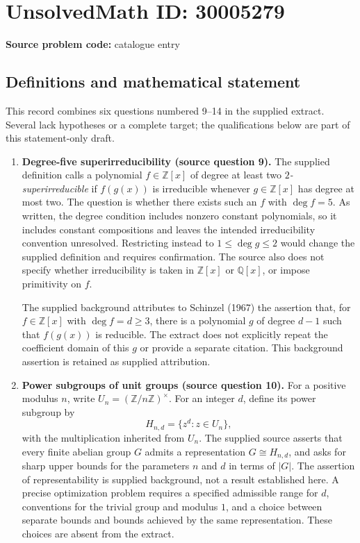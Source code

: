 \documentclass[11pt]{article}
\newcommand{\Z}{\mathbb{Z}}
\newcommand{\Q}{\mathbb{Q}}
\begin{document}
\section*{UnsolvedMath ID: 30005279}
\textbf{Source problem code:} catalogue entry
\subsection{Definitions and mathematical statement}
This record combines six questions numbered 9--14 in the supplied extract. Several lack hypotheses or a complete target; the qualifications below are part of this statement-only draft.

\begin{enumerate}
\item \textbf{Degree-five superirreducibility (source question 9).} The supplied definition calls a polynomial \(f\in\Z[x]\) of degree at least two \emph{\(2\)-superirreducible} if \(f(g(x))\) is irreducible whenever \(g\in\Z[x]\) has degree at most two. The question is whether there exists such an \(f\) with \(\deg f=5\). As written, the degree condition includes nonzero constant polynomials, so it includes constant compositions and leaves the intended irreducibility convention unresolved. Restricting instead to \(1\leq\deg g\leq2\) would change the supplied definition and requires confirmation. The source also does not specify whether irreducibility is taken in \(\Z[x]\) or \(\Q[x]\), or impose primitivity on \(f\).

The supplied background attributes to Schinzel (1967) the assertion that, for \(f\in\Z[x]\) with \(\deg f=d\geq3\), there is a polynomial \(g\) of degree \(d-1\) such that \(f(g(x))\) is reducible. The extract does not explicitly repeat the coefficient domain of this \(g\) or provide a separate citation. This background assertion is retained as supplied attribution.

\item \textbf{Power subgroups of unit groups (source question 10).} For a positive modulus \(n\), write \(U_n=(\Z/n\Z)^\times\). For an integer \(d\), define its power subgroup by
\[
H_{n,d}=\{z^d:z\in U_n\},
\]
with the multiplication inherited from \(U_n\). The supplied source asserts that every finite abelian group \(G\) admits a representation \(G\cong H_{n,d}\), and asks for sharp upper bounds for the parameters \(n\) and \(d\) in terms of \(|G|\). The assertion of representability is supplied background, not a result established here. A precise optimization problem requires a specified admissible range for \(d\), conventions for the trivial group and modulus \(1\), and a choice between separate bounds and bounds achieved by the same representation. These choices are absent from the extract.


\end{enumerate}
\end{document}
